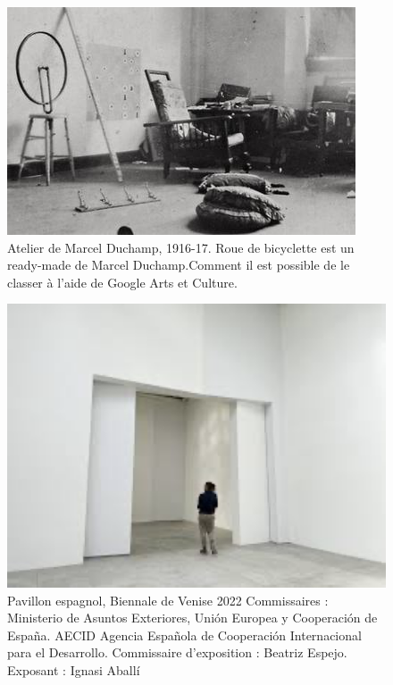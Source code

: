 \documentclass[a4paper, twoside, 12pt]{book}
\begin{document}
\begin{figure}
    \centering
    \includegraphics[width=1\linewidth]{Marcel_Duchamp,_1916-17_studio_photograph.jpg}
    \caption{Atelier de Marcel Duchamp, 1916-17. Roue de bicyclette est un ready-made de Marcel Duchamp.Comment il est possible de le classer à l'aide de Google Arts et Culture.}
    \label{fig:enter-label}
\end{figure}
\begin{figure}
    \centering
    \includegraphics[width=1\linewidth]{esp.png}
    \caption{Pavillon espagnol, Biennale de Venise 2022
Commissaires : Ministerio de Asuntos Exteriores, Unión Europea y Cooperación de España. AECID Agencia Española de Cooperación Internacional para el Desarrollo. Commissaire d'exposition : Beatriz Espejo. Exposant : Ignasi Aballí
}
    \label{fig:enter-label}
\end{figure}
\end{document}
